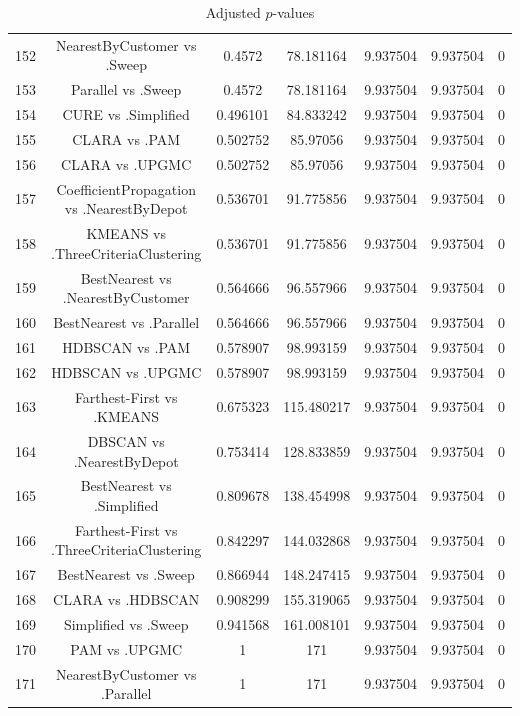 \documentclass[a4paper,10pt]{article}
\begin{document}
\begin{landscape}
\begin{table}[!htp]
\begin{tabular}{ccccccc}
152&NearestByCustomer vs .Sweep&0.4572&78.181164&9.937504&9.937504&0\\
153&Parallel vs .Sweep&0.4572&78.181164&9.937504&9.937504&0\\
154&CURE vs .Simplified&0.496101&84.833242&9.937504&9.937504&0\\
155&CLARA vs .PAM&0.502752&85.97056&9.937504&9.937504&0\\
156&CLARA vs .UPGMC&0.502752&85.97056&9.937504&9.937504&0\\
157&CoefficientPropagation vs .NearestByDepot&0.536701&91.775856&9.937504&9.937504&0\\
158&KMEANS vs .ThreeCriteriaClustering&0.536701&91.775856&9.937504&9.937504&0\\
159&BestNearest vs .NearestByCustomer&0.564666&96.557966&9.937504&9.937504&0\\
160&BestNearest vs .Parallel&0.564666&96.557966&9.937504&9.937504&0\\
161&HDBSCAN vs .PAM&0.578907&98.993159&9.937504&9.937504&0\\
162&HDBSCAN vs .UPGMC&0.578907&98.993159&9.937504&9.937504&0\\
163&Farthest-First vs .KMEANS&0.675323&115.480217&9.937504&9.937504&0\\
164&DBSCAN vs .NearestByDepot&0.753414&128.833859&9.937504&9.937504&0\\
165&BestNearest vs .Simplified&0.809678&138.454998&9.937504&9.937504&0\\
166&Farthest-First vs .ThreeCriteriaClustering&0.842297&144.032868&9.937504&9.937504&0\\
167&BestNearest vs .Sweep&0.866944&148.247415&9.937504&9.937504&0\\
168&CLARA vs .HDBSCAN&0.908299&155.319065&9.937504&9.937504&0\\
169&Simplified vs .Sweep&0.941568&161.008101&9.937504&9.937504&0\\
170&PAM vs .UPGMC&1&171&9.937504&9.937504&0\\
171&NearestByCustomer vs .Parallel&1&171&9.937504&9.937504&0\\
\hline
\end{tabular}
\caption{Adjusted $p$-values}
\end{table}

\end{landscape}
\end{document}
